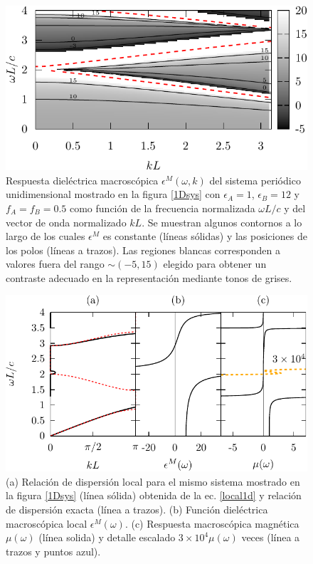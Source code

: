 \documentclass{iopart}
\begin{document}
\begin{figure} \centering
  \includegraphics{1D_epszz_epsa_16_epsb_1_f_05map}
\caption{Respuesta dieléctrica macroscópica
  $\epsilon^M(\omega,k)$ del sistema periódico unidimensional mostrado
  en la figura \ref{1Dsys} con $\epsilon_A=1$, $\epsilon_{B}=12$ y
  $f_{A}=f_{B}=0.5$ como función de la frecuencia normalizada
  $\omega L/c$ y del vector de onda normalizado $kL$. Se muestran
  algunos contornos a lo largo de los cuales $\epsilon^M$ es constante
  (líneas
  sólidas) y las posiciones de los polos (líneas a trazos). Las
  regiones blancas corresponden a valores fuera del rango
  $\sim(-5,15)$  elegido para obtener un contraste adecuado en la
  representación mediante tonos de grises.
}
\label{Fepszz}
\end{figure}






\begin{figure}
\centering
\includegraphics{bandas_locales_1D}
\caption{(a) Relación de dispersión local para el mismo sistema
  mostrado en la figura \ref{1Dsys} (línea sólida) obtenida de la ec.
  \ref{local1d} y relación de dispersión exacta (línea a
  trazos). (b) Función dieléctrica macroscópica local 
  $\epsilon^M(\omega)$.  (c) Respuesta macroscópica magnética
  $\mu(\omega)$ (línea solida) y detalle escalado $3\times
  10^4\mu(\omega)$ veces (línea a trazos y puntos azul).}
\label{1d:localbanda}
\end{figure}
\end{document}
